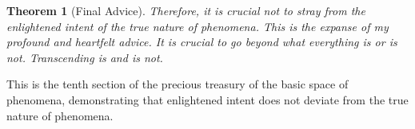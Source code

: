 \documentclass{article}
\newtheorem{theorem}{Theorem}
\begin{document}
\begin{theorem}
  [Final Advice] Therefore, it is crucial not to stray from the enlightened
  intent of the true nature of phenomena. This is the expanse of my profound
  and heartfelt advice. It is crucial to go beyond what everything is or is
  not. Transcending is and is not.
\end{theorem}

\begin{remark}
   This is the tenth section of the precious treasury
  of the basic space of phenomena, demonstrating that enlightened intent does
  not deviate from the true nature of phenomena.
\end{remark}
\end{document}
